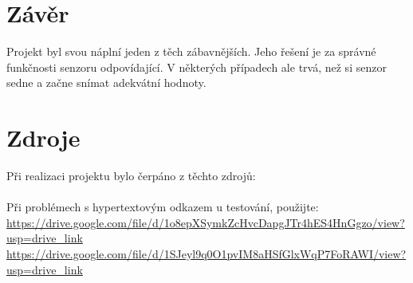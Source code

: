 \documentclass[11.5pt]{article}
\begin{document}
    \section{Závěr}
        Projekt byl svou náplní jeden z těch zábavnějších. Jeho řešení je za správné funkčnosti senzoru odpovídající. V některých případech ale trvá, než si senzor sedne a začne snímat adekvátní hodnoty. 
    \clearpage
    \section{Zdroje}
    Při realizaci projektu bylo čerpáno z těchto zdrojů: \cite{displej} \cite{snimac} \cite{esp32} \cite{pulsesensortutorial} \cite{sensorusingarduino}\\
    \\
    \label{testproblem}Při problémech s hypertextovým odkazem u testování, použijte:\\
    \url{https://drive.google.com/file/d/1o8epXSymkZcHvcDapgJTr4hES4HnGgzo/view?usp=drive_link}\\
    \url{https://drive.google.com/file/d/1SJeyl9q0O1pvIM8aHSfGlxWqP7FoRAWI/view?usp=drive_link}
    
    \printbibliography
	
\end{document}
